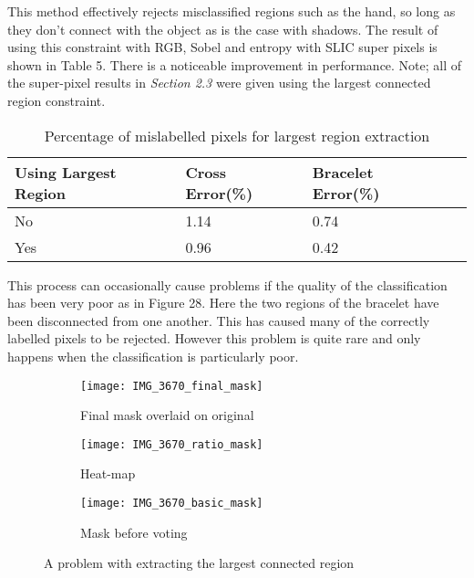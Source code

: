 \documentclass[12pt]{IIBproject}
\begin{document}
This method effectively rejects misclassified regions such as the hand, so long as they don't connect with the object as is the case with shadows. The result of using this constraint with RGB, Sobel and entropy with SLIC super pixels is shown in Table 5. There is a noticeable improvement in performance. Note; all of the super-pixel results in \emph{Section 2.3} were given using the largest connected region constraint.
\begin{table}[H]
\begin{center}
    \begin{tabular}{ | l | l | l | p{5cm} |}
    \hline
    Using Largest Region & Cross Error(\%) & Bracelet Error(\%) \\ \hline
    No & 1.14 & 0.74 \\ \hline
    Yes & 0.96 & 0.42 \\
    \hline
    
    \end{tabular}
    \caption{Percentage of mislabelled pixels for largest region extraction}\label{table:somename}
\end{center}
\end{table}
This process can occasionally cause problems if the quality of the classification has been very poor as in Figure 28. Here the two regions of the bracelet have been disconnected from one another. This has caused many of the correctly labelled pixels to be rejected. However this problem is quite rare and only happens when the classification is particularly poor. 

\begin{figure}[H]
\centering
\begin{subfigure}{.5\textwidth}
  \centering
  \texttt{[image: IMG\_3670\_final\_mask]}
  \caption{Final mask overlaid on original}
  \label{fig:sub2}
\end{subfigure}
\begin{subfigure}{.5\textwidth}
  \centering
  \texttt{[image: IMG\_3670\_ratio\_mask]}
  \caption{Heat-map}
  \label{fig:sub1}
\end{subfigure}%
\begin{subfigure}{.5\textwidth}
  \centering
  \texttt{[image: IMG\_3670\_basic\_mask]}
  \caption{Mask before voting}
  \label{fig:sub2}
\end{subfigure}

\caption{A problem with extracting the largest connected region}
\label{fig:test}
\end{figure}
\end{document}
